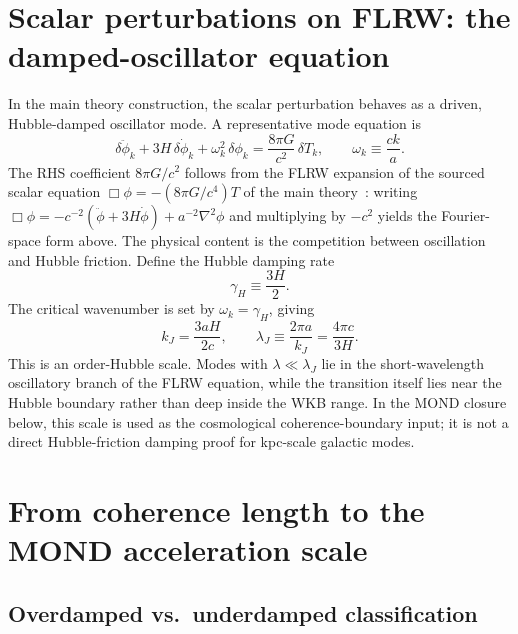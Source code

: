 \documentclass[11pt]{article}
\begin{document}
\section{Scalar perturbations on FLRW: the damped-oscillator equation}\label{sec:osc}
In the main theory construction, the scalar perturbation behaves as a driven, Hubble-damped oscillator mode. A representative mode equation is
\begin{equation}
\delta\ddot{\phi}_k + 3H\,\delta\dot{\phi}_k + \omega_k^2\,\delta\phi_k = \frac{8\pi G}{c^2}\,\delta T_k,
\qquad
\omega_k \equiv \frac{ck}{a}.
\label{eq:damped}
\end{equation}
The RHS coefficient $8\pi G/c^2$ follows from the FLRW expansion of the sourced scalar equation $\Box\phi=-(8\pi G/c^4)T$ of the main theory~\cite{Lotishvili2026}: writing $\Box\phi=-c^{-2}(\ddot\phi+3H\dot\phi)+a^{-2}\nabla^2\phi$ and multiplying by $-c^2$ yields the Fourier-space form above.
The physical content is the competition between oscillation and Hubble friction. Define the Hubble damping rate
\begin{equation}
\gamma_H \equiv \frac{3H}{2}.
\end{equation}
The critical wavenumber is set by $\omega_k=\gamma_H$, giving
\begin{equation}
k_J = \frac{3aH}{2c},
\qquad
\lambda_J \equiv \frac{2\pi a}{k_J} = \frac{4\pi c}{3H}.
\label{eq:jeans}
\end{equation}
This is an order-Hubble scale.  Modes with $\lambda\ll\lambda_J$ lie in the short-wavelength oscillatory branch of the FLRW equation, while the transition itself lies near the Hubble boundary rather than deep inside the WKB range.  In the MOND closure below, this scale is used as the cosmological coherence-boundary input; it is not a direct Hubble-friction damping proof for kpc-scale galactic modes.

\section{From coherence length to the MOND acceleration scale}\label{sec:a0}

\subsection{Overdamped vs.\ underdamped classification}
\end{document}
